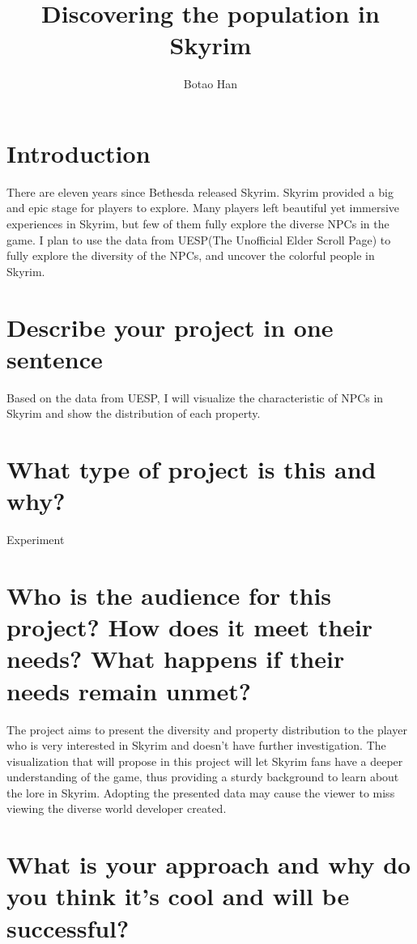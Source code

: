 \documentclass{proc}
\begin{document}
\title{Discovering the population in Skyrim}

\author{Botao Han}

\maketitle

\section{Introduction}

There are eleven years since Bethesda released Skyrim. Skyrim provided a big and epic stage for players to explore. Many players left beautiful yet immersive experiences in Skyrim, but few of them fully explore the diverse NPCs in the game. I plan to use the data from UESP(The Unofficial Elder Scroll Page) to fully explore the diversity of the NPCs, and uncover the colorful people in Skyrim.

\section{Describe your project in one sentence}

Based on the data from UESP, I will visualize the characteristic of NPCs in Skyrim and show the distribution of each property.

\section{What type of project is this and why?}

Experiment

\section{Who is the audience for this project? How does it meet their needs? What happens if their needs remain unmet?}

The project aims to present the diversity and property distribution to the player who is very interested in Skyrim and doesn't have further investigation. The visualization that will propose in this project will let Skyrim fans have a deeper understanding of the game, thus providing a sturdy background to learn about the lore in Skyrim. Adopting the presented data may cause the viewer to miss viewing the diverse world developer created.	

\section{What is your approach and why do you think it’s cool and will be successful?}
\end{document}

